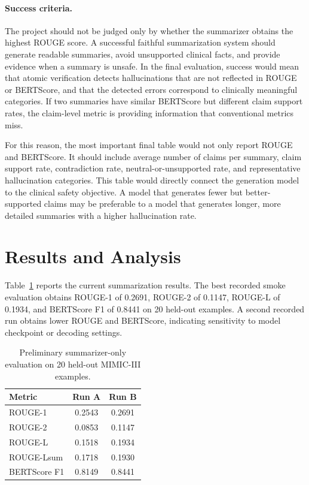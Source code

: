 \documentclass[11pt]{article}
\begin{document}
\paragraph{Success criteria.}
The project should not be judged only by whether the summarizer obtains the highest ROUGE score. A successful faithful summarization system should generate readable summaries, avoid unsupported clinical facts, and provide evidence when a summary is unsafe. In the final evaluation, success would mean that atomic verification detects hallucinations that are not reflected in ROUGE or BERTScore, and that the detected errors correspond to clinically meaningful categories. If two summaries have similar BERTScore but different claim support rates, the claim-level metric is providing information that conventional metrics miss.

For this reason, the most important final table would not only report ROUGE and BERTScore. It should include average number of claims per summary, claim support rate, contradiction rate, neutral-or-unsupported rate, and representative hallucination categories. This table would directly connect the generation model to the clinical safety objective. A model that generates fewer but better-supported claims may be preferable to a model that generates longer, more detailed summaries with a higher hallucination rate.

\section{Results and Analysis}

Table~\ref{tab:results} reports the current summarization results. The best recorded smoke evaluation obtains ROUGE-1 of 0.2691, ROUGE-2 of 0.1147, ROUGE-L of 0.1934, and BERTScore F1 of 0.8441 on 20 held-out examples. A second recorded run obtains lower ROUGE and BERTScore, indicating sensitivity to model checkpoint or decoding settings.

\begin{table}[t]
\small
\centering
\begin{tabular}{@{}lcc@{}}
\toprule
Metric & Run A & Run B \\ \midrule
ROUGE-1 & 0.2543 & 0.2691 \\
ROUGE-2 & 0.0853 & 0.1147 \\
ROUGE-L & 0.1518 & 0.1934 \\
ROUGE-Lsum & 0.1718 & 0.1930 \\
BERTScore F1 & 0.8149 & 0.8441 \\ \bottomrule
\end{tabular}
\caption{Preliminary summarizer-only evaluation on 20 held-out MIMIC-III examples.}
\label{tab:results}
\end{table}
\end{document}
